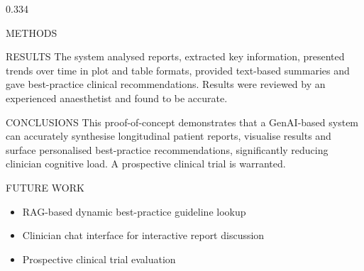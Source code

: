 \documentclass[final]{beamer}
\begin{document}
\begin{frame}[t]{}
\begin{columns}[T, totalwidth=\textwidth]
\begin{column}{0.334\textwidth}
\begin{minipage}[t][0.97\textheight][s]{\linewidth}
\begin{block}{METHODS}
      \vskip0.7cm
      \centering
    \end{block}

    \vfill

    \begin{block}{RESULTS}
      The system analysed reports, extracted key information, presented
      trends over time in plot and table formats, provided text-based
      summaries and gave best-practice clinical recommendations. Results
      were reviewed by an experienced anaesthetist and found to be accurate.
    \end{block}

    \vfill

    \begin{block}{CONCLUSIONS}
      This proof-of-concept demonstrates that a GenAI-based system can
      accurately synthesise longitudinal patient reports, visualise results
      and surface personalised best-practice recommendations, significantly
      reducing clinician cognitive load. A prospective clinical trial is
      warranted.
    \end{block}

    \vfill

    \begin{block}{FUTURE WORK}
      \begin{itemize}[leftmargin=1.3em, itemsep=5pt, topsep=3pt]
        \item RAG-based dynamic best-practice guideline lookup
        \item Clinician chat interface for interactive report discussion
        \item Prospective clinical trial evaluation
      \end{itemize}
    \end{block}

  \end{minipage}
  \end{column}

\end{columns}

\end{frame}
\end{document}
